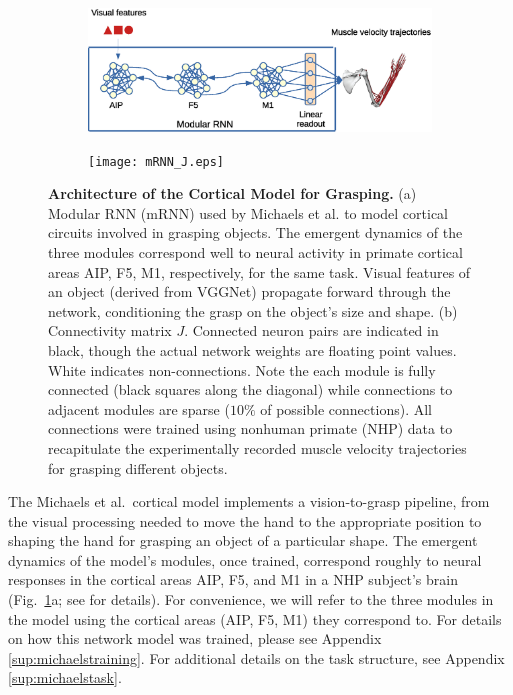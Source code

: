 \documentclass[12pt]{iopart}
\begin{document}
\begin{figure}
	\centering
	\begin{subfigure}[c]{0.69\textwidth}
		\centering
		\includegraphics[width=\textwidth]{michaels.eps}
		\caption{}
	\end{subfigure}
	\hfill
	\begin{subfigure}[c]{0.30\textwidth}
		\centering
		\texttt{[image: mRNN\_J.eps]}
		\caption{}
	\end{subfigure}
	\hfill
\caption{\textbf{Architecture of the Cortical Model for Grasping.} (a) Modular RNN (mRNN) used by Michaels et al.
        \cite{michaels.mrnn} to model cortical circuits involved in grasping objects.
        The emergent dynamics of the three modules correspond well to neural activity in
        primate cortical areas AIP, F5, M1, respectively, for the same task. Visual
        features of an object (derived from VGGNet) propagate forward through the
		network, conditioning the grasp on the object's size and shape. (b)
		Connectivity matrix $J$. Connected neuron pairs are indicated in black, though the
		actual network weights are floating point values. White indicates non-connections.
		Note the each module is fully connected (black squares along the diagonal) while connections to adjacent
        modules are sparse ($10\%$ of possible connections). All connections were trained using nonhuman primate
        (NHP) data to recapitulate the experimentally recorded muscle velocity trajectories for grasping different
        objects.}
\label{fig:michaels}
\end{figure}

The Michaels et al.\ cortical model implements a vision-to-grasp pipeline, from the visual
processing needed to move the hand to the appropriate position to shaping the hand for
grasping an object of a particular shape. The emergent dynamics of the model's modules, once trained,
correspond roughly to neural responses in the cortical areas AIP, F5, and M1 in a NHP subject's brain (Fig.~\ref{fig:michaels}a;
see \cite{michaels.mrnn} for details). For convenience, we will refer to the three
modules in the model using the cortical areas (AIP, F5, M1) they correspond to. For details on how this network model 
was trained, please see Appendix \ref{sup:michaelstraining}. For additional details on the task structure, see
Appendix \ref{sup:michaelstask}.
\end{document}
